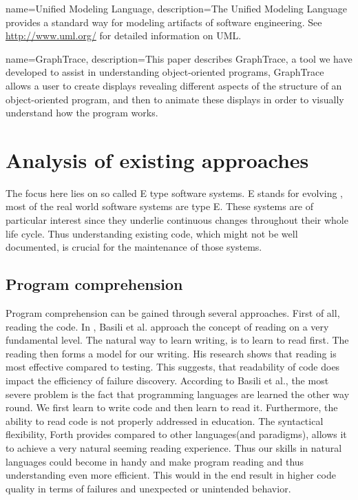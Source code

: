 {
  name={Unified Modeling Language},
  description={The Unified Modeling Language provides a standard way for modeling artifacts of software engineering. See \url{http://www.uml.org/} for detailed information on UML.}
}

{
  name={GraphTrace},
  description={This paper describes GraphTrace, a tool we have developed to assist in understanding object-oriented programs, GraphTrace allows a user to create displays revealing different aspects of the structure of an object-oriented program, and then to animate these displays in order to visually understand how the program works.}
}

\chapter{Analysis of existing approaches}
\label{chap:StateOfTheArt}

The focus here lies on so called E type software systems. E stands for evolving \cite{Cook:2006:ESS:1115566.1115567}, most of the real world software systems are type E. These systems are of particular interest since they underlie continuous changes throughout their whole life cycle. Thus understanding existing code, which might not be well documented, is crucial for the maintenance of those systems.

\section{Program comprehension}

Program comprehension can be gained through several approaches. First of all, reading the code.
In \cite{Basili:1997:EPR:257260.257262}, Basili et al. approach the concept of reading on a very fundamental level. The natural way to learn writing, is to learn to read first. The reading then forms a model for our writing.  His research shows that reading is most effective compared to testing. This suggests, that readability of code does impact the efficiency of failure discovery. According to Basili et al., the most severe problem is the fact that programming languages are learned the other way round. We first learn to write code and then learn to read it. Furthermore, the ability to read code is not properly addressed in education. The syntactical flexibility, Forth provides compared to other languages(and paradigms), allows it to achieve a very natural seeming reading experience. Thus our skills in natural languages could become in handy and make program reading and thus understanding even more efficient. This would in the end result in higher code quality in terms of failures and unexpected or unintended behavior.

